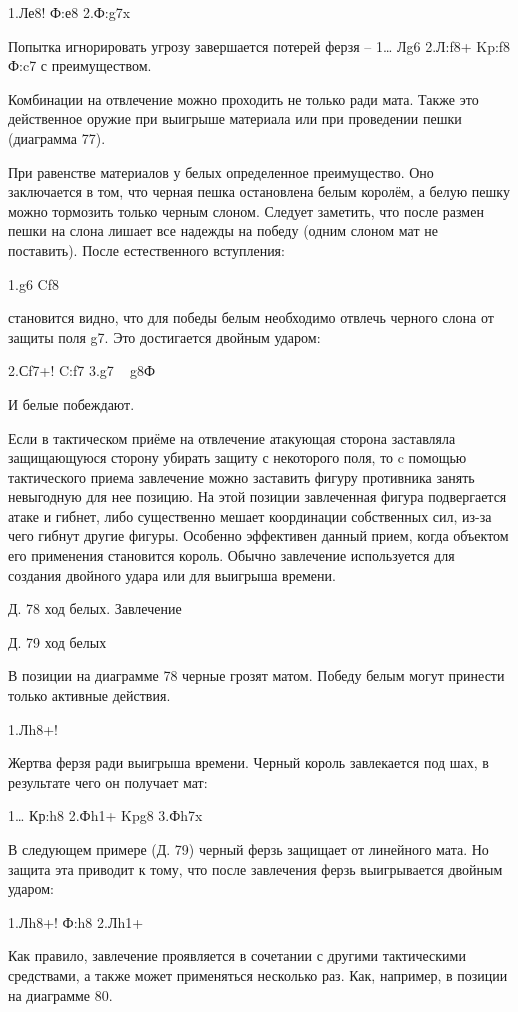 1.Ле8! Ф:е8 2.Ф:g7x

Попытка игнорировать угрозу завершается потерей ферзя – 1… Лg6 2.Л:f8+ Kp:f8 Ф:c7 с преимуществом.

Комбинации на отвлечение можно проходить не только ради мата. Также это действенное оружие при выигрыше материала или при проведении пешки (диаграмма 77).

При равенстве материалов у белых определенное преимущество. Оно заключается в том, что черная пешка остановлена белым королём, а белую пешку можно тормозить только черным слоном. Следует заметить, что после размен пешки на слона лишает все надежды на победу (одним слоном мат не поставить). После естественного вступления:

1.g6 Cf8

становится видно, что для победы белым необходимо отвлечь черного слона от защиты поля g7. Это достигается двойным ударом:

2.Сf7+! C:f7 3.g7 ~ g8Ф

И белые побеждают.

Если в тактическом приёме на отвлечение атакующая сторона заставляла защищающуюся сторону убирать защиту с некоторого поля, то c помощью тактического приема завлечение можно заставить фигуру противника занять невыгодную для нее позицию. На этой позиции завлеченная фигура подвергается атаке и гибнет, либо существенно мешает координации собственных сил, из-за чего гибнут другие фигуры. Особенно эффективен данный прием, когда объектом его применения становится король. Обычно завлечение используется для создания двойного удара или для выигрыша времени.
 
 
Д. 78 ход белых. Завлечение
 
Д. 79 ход белых
 
В позиции на диаграмме 78 черные грозят матом. Победу белым могут принести только активные действия.

1.Лh8+!

Жертва ферзя ради выигрыша времени. Черный король завлекается под шах, в результате чего он получает мат:

1… Кр:h8 2.Фh1+ Kpg8 3.Фh7x

В следующем примере (Д. 79) черный ферзь защищает от линейного мата. Но защита эта приводит к тому, что после завлечения ферзь выигрывается двойным ударом:

1.Лh8+! Ф:h8 2.Лh1+

Как правило, завлечение проявляется в сочетании с другими тактическими средствами, а также может применяться несколько раз. Как, например, в позиции на диаграмме 80.
 

